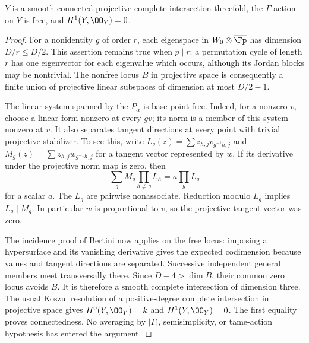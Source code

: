 \begin{lemma}\label{lem:DE-free-ci}
$Y$ is a smooth connected projective complete-intersection threefold, the $\Gamma$-action on $Y$ is free, and $H^1(Y,\OO_Y)=0$.
\end{lemma}
\begin{proof}
For a nonidentity $g$ of order $r$, each eigenspace in $W_0\otimes\overline{\Fp}$ has dimension $D/r\leq D/2$.  This assertion remains true when $p\mid r$: a permutation cycle of length $r$ has one eigenvector for each eigenvalue which occurs, although its Jordan blocks may be nontrivial.  The nonfree locus $B$ in projective space is consequently a finite union of projective linear subspaces of dimension at most $D/2-1$.

The linear system spanned by the $P_\alpha$ is base point free.  Indeed, for a nonzero $v$, choose a linear form nonzero at every $gv$; its norm is a member of this system nonzero at $v$.  It also separates tangent directions at every point with trivial projective stabilizer.  To see this, write $L_g(z)=\sum z_{h,j}v_{g^{-1}h,j}$ and $M_g(z)=\sum z_{h,j}w_{g^{-1}h,j}$ for a tangent vector represented by $w$.  If its derivative under the projective norm map is zero, then
\[
 \sum_g M_g\prod_{h\ne g}L_h=a\prod_gL_g
\]
for a scalar $a$.  The $L_g$ are pairwise nonassociate.  Reduction modulo $L_g$ implies $L_g\mid M_g$.  In particular $w$ is proportional to $v$, so the projective tangent vector was zero.

The incidence proof of Bertini now applies on the free locus: imposing a hypersurface and its vanishing derivative gives the expected codimension because values and tangent directions are separated.  Successive independent general members meet transversally there.  Since $D-4>\dim B$, their common zero locus avoids $B$.  It is therefore a smooth complete intersection of dimension three.  The usual Koszul resolution of a positive-degree complete intersection in projective space gives $H^0(Y,\OO_Y)=k$ and $H^1(Y,\OO_Y)=0$.  The first equality proves connectedness.  No averaging by $|\Gamma|$, semisimplicity, or tame-action hypothesis has entered the argument.
\end{proof}

